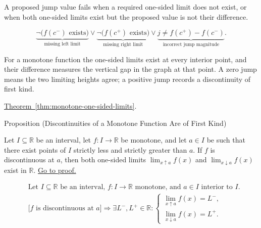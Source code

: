 \begin{remark*}
A proposed jump value fails when a required one-sided limit does not
exist, or when both one-sided limits exist but the proposed value is not
their difference.
\end{remark*}

\begin{remark*}
\[
\underbrace{\neg\bigl(f(c^-)\text{ exists}\bigr)}_{\text{missing left limit}}
\lor
\underbrace{\neg\bigl(f(c^+)\text{ exists}\bigr)}_{\text{missing right limit}}
\lor
\underbrace{j\ne f(c^+)-f(c^-)}_{\text{incorrect jump magnitude}}.
\]
\end{remark*}

\begin{remark*}[Interpretation]
For a monotone function the one-sided limits exist at every interior
point, and their difference measures the vertical gap in the graph at
that point. A zero jump means the two limiting heights agree; a positive
jump records a discontinuity of first kind.
\end{remark*}

\begin{remark*}[Dependencies]
\hyperref[thm:monotone-one-sided-limits]{Theorem~\ref*{thm:monotone-one-sided-limits}}.
\end{remark*}

\begin{propositionbox}{Proposition (Discontinuities of a Monotone Function Are of First Kind)}
\begin{proposition}
\label{prop:monotone-discontinuities-first-kind}
Let $I \subseteq \mathbb{R}$ be an interval, let $f:I \to \mathbb{R}$ be monotone, and let $a \in I$ be such that there exist points of $I$ strictly less and strictly greater than $a$. If $f$ is discontinuous at $a$, then both one-sided limits $\lim_{x\uparrow a} f(x)$ and $\lim_{x\downarrow a} f(x)$ exist in $\mathbb{R}$.
\hyperref[prf:monotone-discontinuities-first-kind]{Go to proof.}
\end{proposition}
\end{propositionbox}

\begin{remark*}
\[
\begin{aligned}
&\text{Let } I \subseteq \mathbb{R} \text{ be an interval, } f:I \to \mathbb{R} \text{ monotone, and } a \in I \text{ interior to } I.\\
&\bigl[f \text{ is discontinuous at } a\bigr]
\Longrightarrow
\exists L^{-},L^{+} \in \mathbb{R} :
\begin{cases}
\displaystyle \lim_{x \uparrow a} f(x) = L^{-},\\[4pt]
\displaystyle \lim_{x \downarrow a} f(x) = L^{+}.
\end{cases}
\end{aligned}
\]
\end{remark*}

